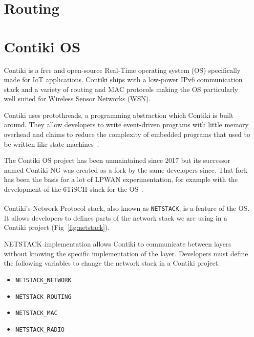 \section{Routing}

\section{Contiki OS}

Contiki is a free and open-source Real-Time operating system (OS) specifically made
for IoT applications. Contiki ships with a low-power IPv6 communication stack
and a variety of routing and MAC protocols making the OS particularly well
suited for Wireless Sensor Networks (WSN).

Contiki uses protothreads, a programming abstraction which Contiki is
built around.
They allow developers to write event-driven programs with little memory overhead and
claims to reduce the complexity of embedded programs that used to be written 
like state machines~\cite{10.1145/1182807.1182811}.

The Contiki OS project has been unmaintained since 2017 but its
successor named Contiki-NG was created as a fork by the same developers since.
That fork has been the basis for a lot of LPWAN experimentation, for example 
with the development of the 6TiSCH stack for the OS~\cite{Duquennoy2017TSCHA6}.

\paragraph{}

Contiki's Network Protocol stack, also known as \lstinline{NETSTACK}, is a
feature of the OS.
It allows developers to defines parts of the network stack we are using in a Contiki
project (Fig~\ref{fig:netstack}).

NETSTACK implementation allows Contiki to communicate between layers without 
knowing the specific implementation of the layer.
Developers must define the following variables to change the network stack 
in a Contiki project.

\begin{itemize}
  \item \lstinline{NETSTACK_NETWORK}
  \item \lstinline{NETSTACK_ROUTING}
  \item \lstinline{NETSTACK_MAC}
  \item \lstinline{NETSTACK_RADIO}
\end{itemize}

